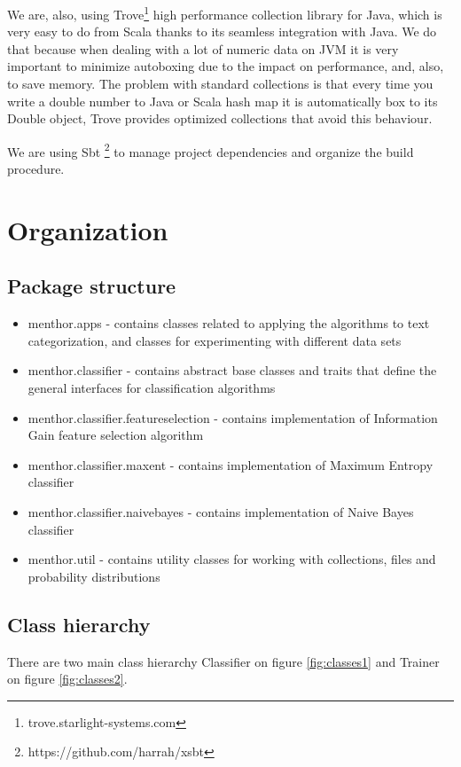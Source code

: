 \documentclass{report}
\begin{document}
We are, also, using Trove\footnote{trove.starlight-systems.com} high performance collection library for Java, which is very easy to do from Scala thanks to its seamless integration with Java. We do that because when dealing with a lot of numeric data on JVM it is very important to minimize autoboxing due to the impact on performance, and, also, to save memory.  The problem with standard collections is that every time you write a double number to Java or Scala hash map it is automatically box to its Double object, Trove provides optimized collections that avoid this behaviour.

We are using Sbt \footnote{https://github.com/harrah/xsbt} to manage project dependencies and organize the build procedure.

\section{Organization}

\subsection{Package structure}

\begin{itemize}

\item menthor.apps - contains classes related to applying the algorithms to text categorization, and classes for experimenting with different data sets
\item menthor.classifier - contains abstract base classes and traits that define the general interfaces for classification algorithms
\item menthor.classifier.featureselection - contains implementation of Information Gain feature selection algorithm
\item menthor.classifier.maxent - contains implementation of Maximum Entropy classifier
\item menthor.classifier.naivebayes - contains implementation of Naive Bayes classifier
\item menthor.util - contains utility classes for working with collections, files and probability distributions
\end{itemize}

\subsection{Class hierarchy}

There are two main class hierarchy Classifier on figure \ref{fig:classes1} and Trainer on figure \ref{fig:classes2}.
 
\end{document}
